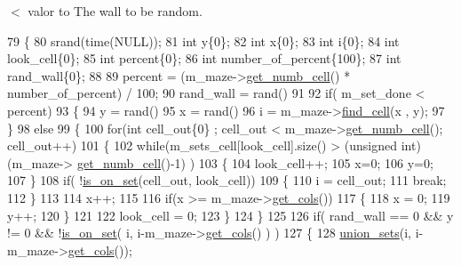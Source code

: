 $<$ valor to The wall to be random. 
\begin{DoxyCode}
79 \{
80     srand(time(NULL));  
81     \textcolor{keywordtype}{int} y\{0\};           
82     \textcolor{keywordtype}{int} x\{0\};           
83     \textcolor{keywordtype}{int} i\{0\};           
84     \textcolor{keywordtype}{int} look\_cell\{0\};   
85     \textcolor{keywordtype}{int} percent\{0\};     
86     \textcolor{keywordtype}{int} number\_of\_percent\{100\};
87     \textcolor{keywordtype}{int} rand\_wall\{0\};   
88 
89     percent = (m\_maze->\hyperlink{classMaze_a90f5c1c140a9991942204d4a7fec3bf8}{get\_numb\_cell}() * number\_of\_percent) / 100;
90     rand\_wall = rand() %
91 
92     \textcolor{keywordflow}{if}( m\_set\_done < percent)
93     \{
94         y = rand() %
95         x = rand() %
96         i = m\_maze->\hyperlink{classMaze_aa59b935dcd5f7129636cea6e40882c56}{find\_cell}(x , y);
97     \}
98     \textcolor{keywordflow}{else}
99     \{
100         \textcolor{keywordflow}{for}(\textcolor{keywordtype}{int} cell\_out\{0\} ; cell\_out < m\_maze->\hyperlink{classMaze_a90f5c1c140a9991942204d4a7fec3bf8}{get\_numb\_cell}(); cell\_out++)
101         \{
102             \textcolor{keywordflow}{while}(m\_sets\_cell[look\_cell].size() > (\textcolor{keywordtype}{unsigned} int)(m\_maze->
      \hyperlink{classMaze_a90f5c1c140a9991942204d4a7fec3bf8}{get\_numb\_cell}()-1) )
103             \{   
104                 look\_cell++;
105                 x=0;
106                 y=0;
107             \}
108             \textcolor{keywordflow}{if}( !\hyperlink{classBuild_ae4eeedfd95306c08d50aff3f620b5a47}{is\_on\_set}(cell\_out, look\_cell))
109             \{
110                 i = cell\_out;
111                 \textcolor{keywordflow}{break};
112             \}
113 
114             x++;
115 
116             \textcolor{keywordflow}{if}(x >= m\_maze->\hyperlink{classMaze_a8a04cd1335e96a80358181afa164d4c9}{get\_cols}())
117             \{
118                 x = 0;
119                 y++;
120             \}
121 
122             look\_cell = 0;
123         \}
124     \}
125 
126     \textcolor{keywordflow}{if}( rand\_wall == 0 && y != 0 && !\hyperlink{classBuild_ae4eeedfd95306c08d50aff3f620b5a47}{is\_on\_set}( i, i-m\_maze->\hyperlink{classMaze_a8a04cd1335e96a80358181afa164d4c9}{get\_cols}() ) )
127     \{
128         \hyperlink{classBuild_af1582ef11fb92698ba75581f2f7ead02}{union\_sets}(i, i-m\_maze->\hyperlink{classMaze_a8a04cd1335e96a80358181afa164d4c9}{get\_cols}());

\end{DoxyCode}
